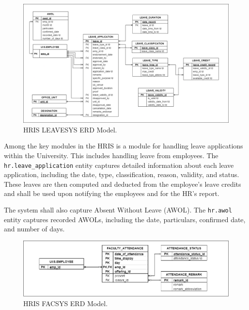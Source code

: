     \begin{figure}[H]
        \centering
        \includegraphics[width=1\linewidth]{figures/images/diagrams/erd/erd-leavesys-employee-leave.png}
        \caption{HRIS LEAVESYS ERD Model.}
        \label{fig:erd-leavesys-employee-leave}
    \end{figure}

    Among the key modules in the HRIS is a module for handling leave applications within the University. This includes handling leave from employees. The \texttt{hr.leave\_application} entity captures detailed information about each leave application, including the date, type, classification, reason, validity, and status. These leaves are then computed and deducted from the employee's leave credits and shall be used upon notifying the employees and for the HR's report.

    The system shall also capture Absent Without Leave (AWOL). The \texttt{hr.awol} entity captures recorded AWOLs, including the date, particulars, confirmed date, and number of days.

    \begin{figure}[H]
        \centering
        \includegraphics[width=1\linewidth]{figures/images/diagrams/erd/erd-facsys-faculty-attendance.png}
        \caption{HRIS FACSYS ERD Model.}
        \label{fig:erd-facsys-faculty-attendance}
    \end{figure}

